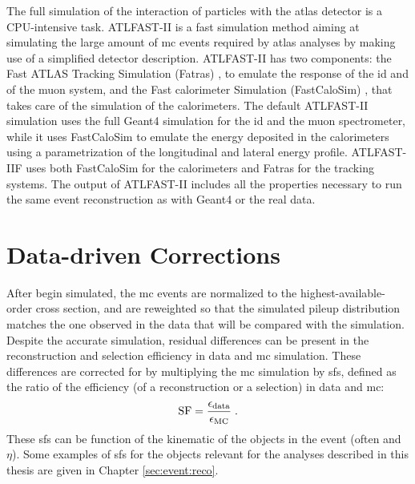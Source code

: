 The full simulation of the interaction of particles with the \gls{atlas} detector is a CPU-intensive task. 
ATLFAST-II \cite{Aad:2010ah} is a fast simulation method aiming at simulating the large amount of \gls{mc} events required by \gls{atlas} analyses by making use of a simplified detector description. 
ATLFAST-II has two components: the Fast ATLAS Tracking Simulation (Fatras) \cite{Edmonds:2008zz}, to emulate the response of the \gls{id} and of the muon system, 
and the Fast calorimeter Simulation (FastCaloSim) \cite{ATLAS:1300517}, that takes care of the simulation of the calorimeters. The default ATLFAST-II simulation uses the full Geant4 simulation for the \gls{id} and the muon spectrometer, 
while it uses FastCaloSim to emulate the energy deposited in the calorimeters using a parametrization of the longitudinal and lateral energy profile. 
ATLFAST-IIF uses both FastCaloSim for the calorimeters and Fatras for the tracking systems. 
The output of ATLFAST-II includes all the properties necessary to run the same event reconstruction as with Geant4 or the real data.



\section{Data-driven Corrections}

After begin simulated, the \gls{mc} events are normalized to the highest-available-order cross section, and are reweighted so that the simulated pileup distribution matches the one observed in the data that will be compared with the simulation.
Despite the accurate simulation, residual differences can be present in the reconstruction and selection efficiency in data and \gls{mc} simulation. 
These differences are corrected for by multiplying the \gls{mc} simulation by \glspl{sf}, defined as the ratio of the efficiency (of a reconstruction or a selection) in data and \gls{mc}:
\begin{equation}
{\rm SF} = \frac{\epsilon_{\rm data}}{\epsilon_{\rm MC}} \; .
\end{equation}
\noindent These \glspl{sf} can be function of the kinematic of the objects in the event (often \pt and $\eta$). 
Some examples of \glspl{sf} for the objects relevant for the analyses described in this thesis are given in Chapter \ref{sec:event:reco}.




